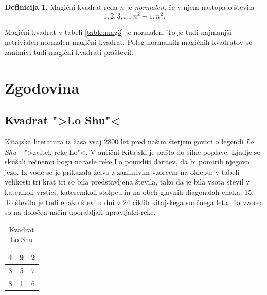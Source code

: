 \documentclass[a4paper,12pt]{article}
\theoremstyle{definition}
\newtheorem{definicija}{Definicija}
\theoremstyle{plain}
\begin{document}
\begin{definicija}
   Magični kvadrat reda \(n\) je \emph{normalen}, če v njem nastopajo števila
   \begin{equation}
      \label{eq:numbers}
      1, 2, 3, \ldots, n^2-1, n^2.
   \end{equation}
\end{definicija}

Magični kvadrat v tabeli \ref{table:mag3} je normalen.
To je tudi najmanjši netrivialen normalen magični kvadrat.
Poleg normalnih magičnih kvadratov so zanimivi tudi magični kvadrati praštevil.


\section{Zgodovina}

\subsection{Kvadrat ">Lo Shu"<}

Kitajska literatura iz časa vsaj 2800 let pred našim štetjem govori o legendi
\emph{Lo Shu} -- ">zvitek reke Lo"<. V antični Kitajski je prišlo do
silne poplave. Ljudje so skušali rečnemu bogu narasle reke Lo ponuditi daritev,
da bi pomirili njegovo jezo. Iz vode se je prikazala želva z zanimivim vzorcem
na oklepu: v tabeli velikosti tri krat tri so bila predstavljena števila, tako
da je bila vsota števil v katerikoli vrstici, kateremkoli stolpcu in na obeh
glavnih diagonalah enaka: 15. To število je tudi enako številu dni v 24 ciklih
kitajskega sončnega leta. Ta vzorec so na določen način uporabljali upravljalci
reke.
\begin{table}[h]
   \centering
   \caption{Kvadrat Lo Shu}
   \label{table:loshu}
   \begin{tabular}{|c|c|c|}
      \hline
      4 & 9 & 2 \\
      \hline
      3 & 5 & 7 \\
      \hline
      8 & 1 & 6 \\
      \hline
   \end{tabular}
\end{table}

\end{document}
